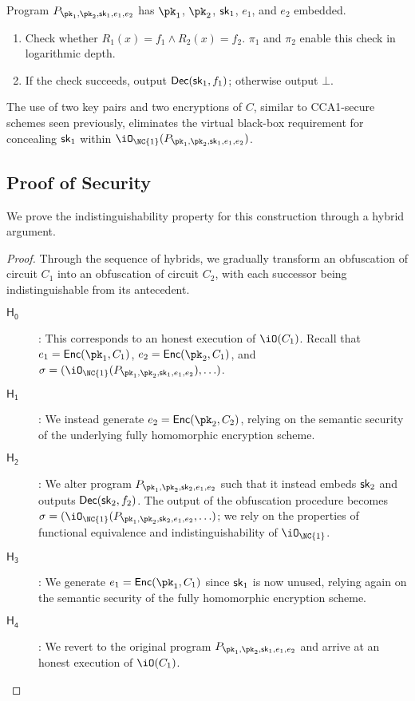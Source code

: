 Program $\prog{1}$ has $\pk_1$, $\pk_2$, $\mathsf{sk}_1$, $e_1$, and $e_2$
embedded.
\begin{enumerate}
\item
	Check whether $R_1(x) = f_1 \land R_2(x) = f_2$.
	$\pi_1$ and $\pi_2$ enable this check in logarithmic depth.
\item
	If the check succeeds, output $\mathsf{Dec}(\mathsf{sk}_1, f_1)$;
	otherwise output $\bot$.
\end{enumerate}

The use of two key pairs and two encryptions of $C$, similar to
CCA1-secure schemes seen previously, eliminates the virtual black-box
requirement for concealing $\mathsf{sk}_1$ within $\iO_{\NC{1}}(\prog{1})$.

\subsection{Proof of Security}

We prove the indistinguishability property for this construction
through a hybrid argument.

\newcommand{\Hyb}[1]{\ensuremath{\mathsf{H_{#1}}}}
\begin{proof}
Through the sequence of hybrids, we gradually transform an obfuscation
of circuit $C_1$ into an obfuscation of circuit $C_2$, with each
successor being indistinguishable from its antecedent.
\begin{description}
\item[$\Hyb{0}$]:
	This corresponds to an honest execution of $\iO(C_1)$.
	Recall that $e_1 = \Enc(\pk_1, C_1)$, $e_2 = \Enc(\pk_2, C_1)$,
	and $\sigma = (\iO_{\NC{1}}(\prog{1}), \ldots)$.

\item[$\Hyb{1}$]:
	We instead generate $e_2 = \Enc(\pk_2, C_2)$, relying on the
	semantic security of the underlying fully homomorphic encryption
	scheme.

\item[$\Hyb{2}$]:
	We alter program $\prog{2}$ such that it instead embeds $\mathsf{sk}_2$
	and outputs $\mathsf{Dec}(\mathsf{sk}_2, f_2)$.
	The output of the obfuscation procedure becomes
	$\sigma = (\iO_{\NC{1}}(\prog{2}, \ldots)$;
	we rely on the properties of functional equivalence and
	indistinguishability of $\iO_{\NC{1}}$.

\item[$\Hyb{3}$]:
	We generate $e_1 = \Enc(\pk_1, C_1)$ since $\mathsf{sk}_1$ is now
	unused, relying again on the semantic security of the fully
	homomorphic encryption scheme.

\item[$\Hyb{4}$]:
	We revert to the original program $\prog{1}$ and arrive
	at an honest execution of $\iO(C_1)$.

\end{description}
\end{proof}


